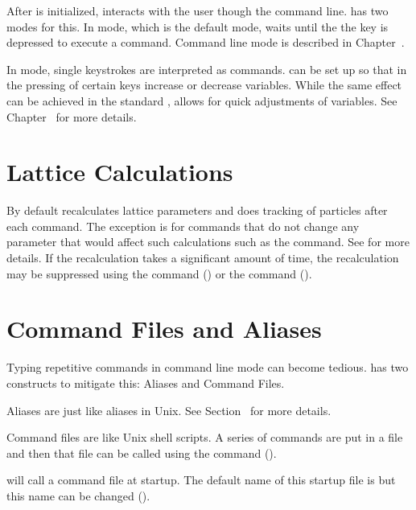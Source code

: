 After \tao is initialized, \tao interacts with the user though the command line. \tao has two modes
for this. In  mode, which is the default mode, \tao waits until the the 
key is depressed to execute a command. Command line mode is described in Chapter~. 

In  mode, single keystrokes are interpreted as commands. \tao can be set up so that in
 the pressing of certain keys increase or decrease variables. While the same effect
can be achieved in the standard ,  allows for quick adjustments of
variables. See Chapter~ for more details.

\section{Lattice Calculations}
\label{s:lat.calc.overview} 

By default \tao recalculates lattice parameters and does tracking of particles after each command.
The exception is for commands that do not change any parameter that would affect such calculations
such as the  command. See  for more details. If the recalculation takes a
significant amount of time, the recalculation may be suppressed using the  command () or the  command
().

\section{Command Files and Aliases}
\label{s:command.files} 

Typing repetitive commands in command line mode can become tedious. \tao has two constructs to
mitigate this: Aliases and Command Files. 

Aliases are just like aliases in Unix. See Section~ for more details.

Command files are like Unix shell scripts. A series of commands are
put in a file and then that file can be called using the 
command ().

\tao will call a command file at startup. The default name of this startup file is 
but this name can be changed ().

